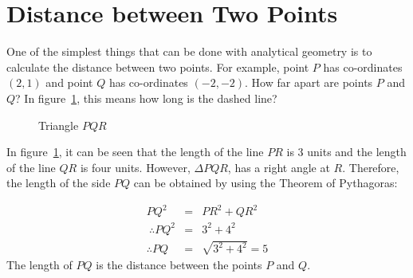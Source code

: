             \section{ Distance between Two Points}
            \nopagebreak
            \label{m39107*id66786}One of the simplest things that can be done with analytical geometry is to calculate the distance between two points.  For example, point $P$ has co-ordinates $(2,1)$ and point $Q$ has co-ordinates $(-2,-2)$. How far apart are points $P$ and $Q$? In figure~\ref{fig:trianglePQR}, this means how long is the dashed line?\par 
    \setcounter{subfigure}{0}
 	\begin{figure}[H] %
    \begin{center}
\caption{Triangle $PQR$}
    \end{center}
\label{fig:trianglePQR}
 \end{figure}        
        \label{m39107*id66883}In figure~\ref{fig:trianglePQR}, it can be seen that the length of the line $PR$ is 3 units and the length of the line $QR$ is four units. However, $\Delta PQR$, has a right angle at $R$. Therefore, the length of the side $PQ$ can be obtained by using the Theorem of Pythagoras:\par 
        \label{m39107*id66950}\nopagebreak\noindent{}          
    \begin{eqnarray*}
     P{Q}^{2} & = & P{R}^{2}+Q{R}^{2} \\ \
\therefore P{Q}^{2} & = & {3}^{2}+{4}^{2} \\ 
\therefore PQ & = & \sqrt{{3}^{2}+{4}^{2}}=5  
      \end{eqnarray*}
        \label{m39107*id67090}The length of $PQ$ is the distance between the points $P$ and $Q$.\par 
